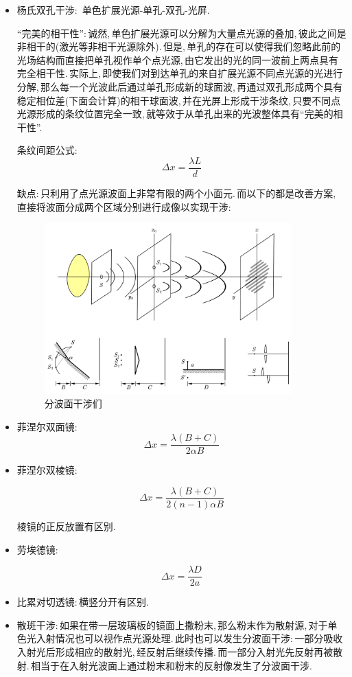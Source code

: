 \begin{itemize}
\item 杨氏双孔干涉:\, 单色扩展光源-单孔-双孔-光屏.

``完美的相干性'':\,诚然,\,单色扩展光源可以分解为大量点光源的叠加,\,彼此之间是非相干的(激光等非相干光源除外).\,但是,\,单孔的存在可以使得我们忽略此前的光场结构而直接把单孔视作单个点光源,\,由它发出的光的同一波前上两点具有完全相干性.\,实际上,\,即使我们对到达单孔的来自扩展光源不同点光源的光进行分解,\,那么每一个光波此后通过单孔形成新的球面波,\,再通过双孔形成两个具有稳定相位差(下面会计算)的相干球面波,\,并在光屏上形成干涉条纹,\,只要不同点光源形成的条纹位置完全一致,\,就等效于从单孔出来的光波整体具有``完美的相干性''.

条纹间距公式:
\[\Delta x=\frac{\lambda L}{d}\]

缺点:\,只利用了点光源波面上非常有限的两个小面元.\,而以下的都是改善方案,\,直接将波面分成两个区域分别进行成像以实现干涉:

\begin{figure}[H]
\centering
\includegraphics[width=0.9\textwidth]{image/14-1-3.png}
\caption{分波面干涉们}
\end{figure}

\item 菲涅尔双面镜:
\[\Delta x=\frac{\lambda (B+C)}{2\alpha B}\]

\item 菲涅尔双棱镜:

\[\Delta x=\frac{\lambda (B+C)}{2(n-1)\alpha B}\]

棱镜的正反放置有区别.

\item 劳埃德镜:

\[\Delta x=\frac{\lambda D}{2a}\]

\item 比累对切透镜:\,横竖分开有区别.

\item 散斑干涉:\,如果在带一层玻璃板的镜面上撒粉末,\,那么粉末作为散射源,\,对于单色光入射情况也可以视作点光源处理.\,此时也可以发生分波面干涉:\,一部分吸收入射光后形成相应的散射光,\,经反射后继续传播.\,而一部分入射光先反射再被散射.\,相当于在入射光波面上通过粉末和粉末的反射像发生了分波面干涉.

\end{itemize}

